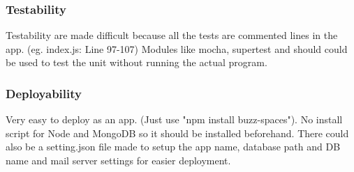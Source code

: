 \subsubsection{Testability}

Testability are made difficult because all the tests are commented lines in the app. (eg. index.js: Line 97-107) Modules like mocha, supertest and should could be used to test the unit without running the actual program.

\subsubsection{Deployability}

Very easy to deploy as an app. (Just use "npm install buzz-spaces"). No install script for Node and MongoDB so it should be installed beforehand. There could also be a setting.json file made to setup the app name, database path and DB name and mail server settings for easier deployment.